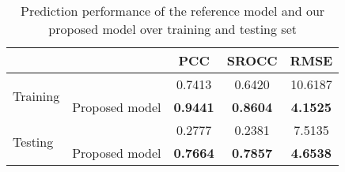 %   

\begin{table}[tb]
\caption{Prediction performance of the reference model and our proposed model over training and testing set}
\centering
\begin{tabular}{|l|l|c|c|c|}
\hline
& & PCC & SROCC & RMSE \\
\hline
\multicolumn{1}{|l|}{\multirow{2}{*}{Training}}   & \multicolumn{1}{l|}{\cite{CumulativeQoE_Assessing}}                  & 0.7413       & 0.6420         & 10.6187        \\
\multicolumn{1}{|l|}{}                                & \multicolumn{1}{l|}{Proposed model}  & \textbf{0.9441}       & \textbf{0.8604}         & \textbf{4.1525}         \\
\hline
\multicolumn{1}{|l|}{\multirow{2}{*}{Testing}}    & \multicolumn{1}{l|}{\cite{CumulativeQoE_Assessing}}                  & 0.2777       & 0.2381         & 7.5135         \\
\multicolumn{1}{|l|}{}                                & \multicolumn{1}{l|}{Proposed model}  & \textbf{0.7664}       & \textbf{0.7857}         & \textbf{4.6538}         \\
\hline
\end{tabular} \label{tbl:PerformanceDataset}
\end{table}
